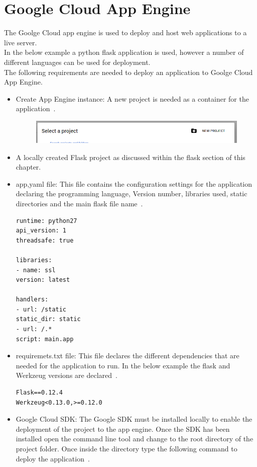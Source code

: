 \section{Google Cloud App Engine}
The Goolge Cloud app engine is used to deploy and host web applications to a live server.\\
In the below example a python flask application is used, however a number of different languages can be used for deployment.\\
The following requirements are needed to deploy an application to Goolge Cloud App Engine.
\begin{itemize}
	\item Create App Engine instance:
	A new project is needed as a container for the application~\cite{CreatingAppEngine:online}.
	\begin{figure}[H]
		\centering
		\includegraphics[width=0.7\linewidth]{img/GoogleNEwPRoject}
		\caption{}
		\label{fig:googlenewproject}
	\end{figure}
	
	\item A locally created Flask project as discussed within the flask section of this chapter.
	\item app,yaml file:
	This file contains the configuration settings for the application declaring the programming language, Version number, libraries used, static directories and the main flask file name~\cite{FlaskAppGoolge:online}.
\begin{verbatim}
runtime: python27
api_version: 1
threadsafe: true

libraries:
- name: ssl
version: latest

handlers:
- url: /static
static_dir: static
- url: /.*
script: main.app
\end{verbatim}
	\item requiremets.txt file:
	This file declares the different dependencies that are needed for the application to run.
	In the below example the flask and Werkzeug versions are declared~\cite{FlaskAppGoolge:online}.
\begin{verbatim}
Flask==0.12.4
Werkzeug<0.13.0,>=0.12.0
\end{verbatim}
	\item Google Cloud SDK:
	The Google SDK must be installed locally to enable the deployment of the project to the app engine. Once the SDK has been installed open the command line tool and change to the root directory of the project folder. Once inside the directory type the following command to deploy the application~\cite{FlaskAppGoolge:online}.
\end{itemize}

